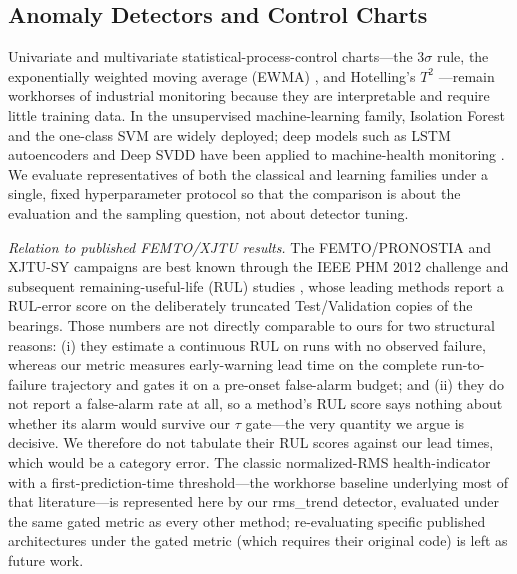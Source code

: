 \documentclass[IJPHM, 2026, 0]{PHMSociety}
\begin{document}
\subsection{Anomaly Detectors and Control Charts}
Univariate and multivariate statistical-process-control charts---the $3\sigma$ rule, the exponentially weighted moving average (EWMA) \cite{roberts1959control}, and Hotelling's $T^2$ \cite{hotelling1947multivariate}---remain workhorses of industrial monitoring \cite{montgomery2009introduction} because they are interpretable and require little training data. In the unsupervised machine-learning family, Isolation Forest \cite{liu2008isolation} and the one-class SVM \cite{scholkopf2001estimating} are widely deployed; deep models such as LSTM autoencoders \cite{hochreiter1997long,malhotra2016lstm,hundman2018detecting} and Deep SVDD \cite{ruff2018deep} have been applied to machine-health monitoring \cite{zhao2019deep}. We evaluate representatives of both the classical and learning families under a single, fixed hyperparameter protocol so that the comparison is about the evaluation and the sampling question, not about detector tuning.

\emph{Relation to published FEMTO/XJTU results.} The FEMTO/PRONOSTIA and XJTU-SY campaigns are best known through the IEEE PHM 2012 challenge and subsequent remaining-useful-life (RUL) studies \cite{wang2020hybrid,nectoux2012pronostia}, whose leading methods report a RUL-error score on the deliberately truncated Test/Validation copies of the bearings. Those numbers are not directly comparable to ours for two structural reasons: (i) they estimate a continuous RUL on runs with no observed failure, whereas our metric measures early-warning lead time on the complete run-to-failure trajectory and gates it on a pre-onset false-alarm budget; and (ii) they do not report a false-alarm rate at all, so a method's RUL score says nothing about whether its alarm would survive our $\tau$ gate---the very quantity we argue is decisive. We therefore do not tabulate their RUL scores against our lead times, which would be a category error. The classic normalized-RMS health-indicator with a first-prediction-time threshold---the workhorse baseline underlying most of that literature---is represented here by our rms\_trend detector, evaluated under the same gated metric as every other method; re-evaluating specific published architectures under the gated metric (which requires their original code) is left as future work.
\end{document}
